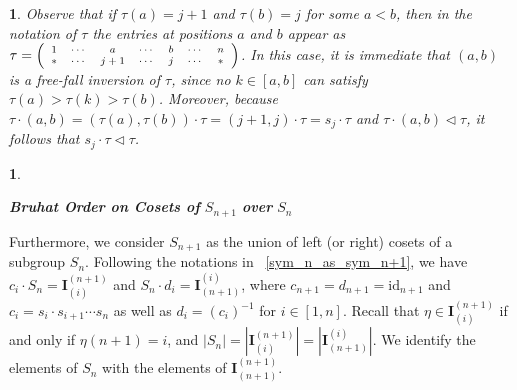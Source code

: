 \documentclass[a4 paper,12pt]{article}
\newcommand{\sma}{\triangleleft}
\newtheorem{numeris}{}[section]
\newtheorem{subnum}{}[numeris]
\begin{document}
\begin{subnum} Observe that if $\tau(a) = j+1$ and $\tau(b) = j$ for some $a<b$, then in the  notation of $\tau$ the entries at positions $a$ and $b$ appear as $\tau = \begin{scriptsize} \left(
\begin{array}{ccccccc}
1 & \cdots  & a &  \cdots &b & \cdots & n\\
	\ast & \cdots & j+1 & \cdots & j& \cdots &\ast
\end{array}\right)
  \end{scriptsize}$. In this case, it is immediate that $(a,b)$ is a free-fall inversion of $\tau$, since no $k \in [a,b]$ can satisfy $\tau(a)>\tau(k)>\tau(b)$. Moreover, because   $\tau \cdot (a,b) = (\tau(a), \tau(b))\cdot \tau = (j+1,j)\cdot \tau = s_{j}\cdot \tau  $ and $\tau \cdot (a,b) \sma \tau$, it follows that 
	$s_j \cdot \tau \sma \tau$.
\label{free_fall_Remark}
\end{subnum}






\begin{numeris}\begin{center}\textbf{Bruhat Order on Cosets of} $S_{n+1}$ \textbf{over} $S_{n}$\end{center}\end{numeris}
\begin{small}Furthermore, we consider  $S_{n+1}$ as the union of  left  (or right) cosets of a subgroup $S_n$.
Following the notations in ~\ref{sym_n_as_sym_n+1}, we have $c_{i} \cdot  S_n = \textbf{I}_{(i)}^{(n+1)}$ and  $ S_n \cdot  d_{i} = \textbf{I}_{(n+1)}^{(i)}$, where   $c_{n+1} = d_{n+1} = \textrm{id}_{n+1}$ and $c_{i}= s_{i}\cdot  s_{i+1}\cdots  s_n$ as well as $d_{i}= \left(c_{i}\right)^{-1}$ for  $i\in \left[1,n\right]$. Recall that $\eta\in \textbf{I}_{(i)}^{(n+1)}$ if and only if $\eta(n+1)=i$, and  $\left|S_n\right|=\left|\textbf{I}_{(i)}^{(n+1)}\right| = \left|\textbf{I}_{(n+1)}^{(i)}\right|$.  We identify the elements of  $S_n$ with the elements of   $\textbf{I}_{(n+1)}^{(n+1)}$.  
\end{small}\\
\end{document}
